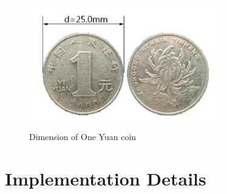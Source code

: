 \documentclass[12pt, a4paper, twoside]{article}
\begin{document}
	\begin{figure}[p]
		\centering
		\includegraphics[width=0.75\textwidth]{coin}
		\caption{Dimension of One Yuan coin}
		\label{F:coin}
	\end{figure}
	
	\section{Implementation Details}
\end{document}
